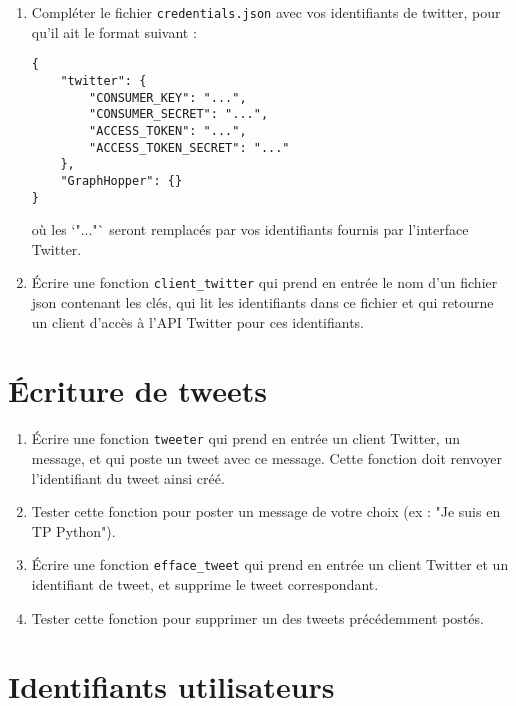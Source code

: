 \documentclass[11pt,a4paper]{article}
\begin{document}
\begin{enumerate}
    \item Compléter le fichier \verb+credentials.json+ avec vos identifiants de twitter, pour qu'il ait le format suivant : 
\begin{verbatim}
{
    "twitter": {
        "CONSUMER_KEY": "...",
        "CONSUMER_SECRET": "...",
        "ACCESS_TOKEN": "...",
        "ACCESS_TOKEN_SECRET": "..."
    },
    "GraphHopper": {}
}

\end{verbatim}
où les `"..."` seront remplacés par vos identifiants fournis par l'interface Twitter.

\item Écrire une fonction \verb+client_twitter+ qui prend en entrée le nom d'un fichier json contenant les clés, qui lit les identifiants dans ce fichier et qui retourne un client d'accès à l'API Twitter pour ces identifiants.
\end{enumerate}




\section{Écriture de tweets}
\begin{enumerate}
    \item Écrire une fonction \verb+tweeter+ qui prend en entrée un client Twitter, un message, et qui poste un tweet avec ce message. 
    Cette fonction doit renvoyer l'identifiant du tweet ainsi créé.
    \item Tester cette fonction pour poster un message de votre choix (ex : "Je suis en TP Python"). 
    \item Écrire une fonction \verb+efface_tweet+ qui prend en entrée un client Twitter et un identifiant de tweet, et supprime le tweet correspondant.
    \item Tester cette fonction pour supprimer un des tweets précédemment postés.
\end{enumerate}


\section{Identifiants utilisateurs}
\end{document}
